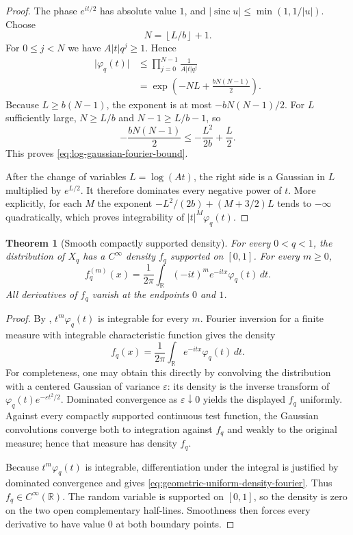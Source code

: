 \documentclass[11pt,oneside,openany]{book}
\newtheorem{theorem}{Theorem}[chapter]
\theoremstyle{definition}
\theoremstyle{remark}
\newcommand{\R}{\mathbb R}
\newcommand{\abs}[1]{\lvert #1\rvert}
\newcommand{\floor}[1]{\left\lfloor #1\right\rfloor}
\begin{document}
\begin{proof}
The phase $e^{it/2}$ has absolute value $1$, and
$\abs{\operatorname{sinc}u}\le\min(1,1/\abs u)$.  Choose
\[
 N=\floor{L/b}+1.
\]
For $0\le j<N$ we have $A\abs t q^j\ge1$.  Hence
\begin{align*}
 \abs{\varphi_q(t)}
 &\le\prod_{j=0}^{N-1}\frac1{A\abs t q^j}\\
 &=\exp\!\left(-NL+\frac{bN(N-1)}2\right).
\end{align*}
Because $L\ge b(N-1)$, the exponent is at most
$-bN(N-1)/2$.  For $L$ sufficiently large,
$N\ge L/b$ and $N-1\ge L/b-1$, so
\[
 -\frac{bN(N-1)}2
 \le-\frac{L^2}{2b}+\frac L2.
\]
This proves \eqref{eq:log-gaussian-fourier-bound}.

After the change of variables $L=\log(A t)$, the right side is a Gaussian in $L$ multiplied by $e^{L/2}$.  It therefore dominates every negative power of $t$.  More explicitly, for each $M$ the exponent
$-L^2/(2b)+(M+3/2)L$ tends to $-\infty$ quadratically, which proves integrability of $\abs t^M\varphi_q(t)$.
\end{proof}

\begin{theorem}[Smooth compactly supported density]\label{thm:geometric-uniform-smooth-density}
For every $0<q<1$, the distribution of $X_q$ has a $C^\infty$ density $f_q$ supported on $[0,1]$.  For every $m\ge0$,
\begin{equation}\label{eq:geometric-uniform-density-fourier}
 f_q^{(m)}(x)
 =\frac1{2\pi}\int_{\R}(-it)^m e^{-itx}\varphi_q(t)\,dt.
\end{equation}
All derivatives of $f_q$ vanish at the endpoints $0$ and $1$.
\end{theorem}

\begin{proof}
By , $t^m\varphi_q(t)$ is integrable for every $m$.  Fourier inversion for a finite measure with integrable characteristic function gives the density
\[
 f_q(x)=\frac1{2\pi}\int_{\R}e^{-itx}\varphi_q(t)\,dt.
\]
For completeness, one may obtain this directly by convolving the distribution with a centered Gaussian of variance $\varepsilon$: its density is the inverse transform of
$\varphi_q(t)e^{-\varepsilon t^2/2}$.  Dominated convergence as
$\varepsilon\downarrow0$ yields the displayed $f_q$ uniformly.  Against every compactly supported continuous test function, the Gaussian convolutions converge both to integration against $f_q$ and weakly to the original measure; hence that measure has density $f_q$.

Because $t^m\varphi_q(t)$ is integrable, differentiation under the integral is justified by dominated convergence and gives \eqref{eq:geometric-uniform-density-fourier}.  Thus $f_q\in C^\infty(\R)$.  The random variable is supported on $[0,1]$, so the density is zero on the two open complementary half-lines.  Smoothness then forces every derivative to have value $0$ at both boundary points.
\end{proof}
\end{document}
